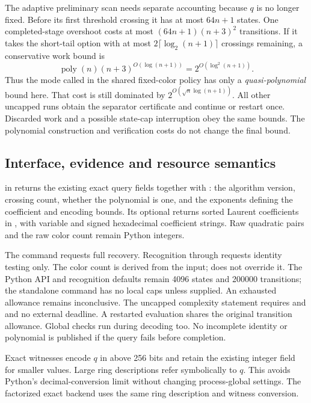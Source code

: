 The adaptive preliminary scan needs separate accounting because $q$ is no
longer fixed.  Before its first threshold crossing it has at most $64n+1$
states.  One completed-stage overshoot costs at most
$(64n+1)(n+3)^2$ transitions.  If it takes the short-tail option with at most
$2\lceil\log_2(n+1)\rceil$ crossings remaining, a conservative work bound is
\[
 \operatorname{poly}(n)(n+3)^{O(\log(n+1))}
 =2^{O(\log^2(n+1))}.
\]
Thus the mode called  in the shared fixed-color policy
has only a \emph{quasi-polynomial} bound here.  That cost is still dominated
by $2^{O(\sqrt n\log(n+1))}$.  All other uncapped runs obtain the separator
certificate and continue or restart once.  Discarded work and a possible
state-cap interruption obey the same bounds.  The polynomial construction
and verification costs do not change the final bound.

\subsection{Interface, evidence and resource semantics}

 in 
returns the existing exact query fields together with
: the algorithm version, crossing count, whether
the polynomial is one, and the exponents defining the coefficient and
encoding bounds.  Its optional  returns
sorted Laurent coefficients in , with variable
 and signed hexadecimal coefficient strings.  Raw quadratic pairs
and the raw color count remain Python integers.

The command 
requests full recovery.  Recognition through
 requests identity testing only.
The color count is derived from the input;  does not
override it.  The Python API and recognition defaults remain 4096 states and
200000 transitions; the standalone  command has no local caps
unless supplied.  An exhausted allowance remains inconclusive.
The uncapped complexity statement
requires  and  and no
external deadline.  A restarted evaluation shares the original transition
allowance.  Global checks run during decoding too.  No incomplete identity
or polynomial is published if the query fails before completion.

Exact witnesses encode $q$ in  above 256 bits and retain the
existing integer  field for smaller values.  Large ring descriptions
refer symbolically to $q$.  This avoids Python's decimal-conversion limit
without changing process-global settings.  The factorized exact backend
uses the same ring description and witness conversion.

